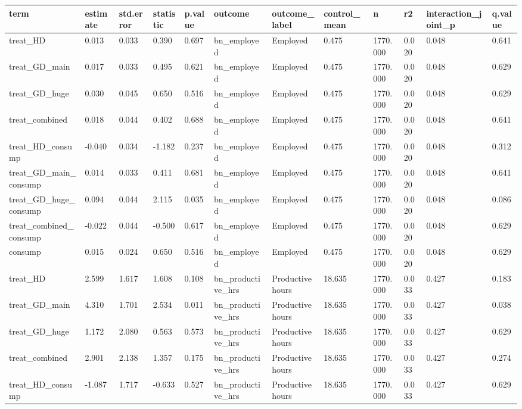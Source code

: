 \begin{tabular}{llllllllllll}
\toprule
term & estimate & std.error & statistic & p.value & outcome & outcome\_label & control\_mean & n & r2 & interaction\_joint\_p & q.value
 \\
\midrule
treat\_HD & 0.013 & 0.033 & 0.390 & 0.697 & bn\_employed & Employed & 0.475 & 1770.000 & 0.020 & 0.048 & 0.641 \\
treat\_GD\_main & 0.017 & 0.033 & 0.495 & 0.621 & bn\_employed & Employed & 0.475 & 1770.000 & 0.020 & 0.048 & 0.629 \\
treat\_GD\_huge & 0.030 & 0.045 & 0.650 & 0.516 & bn\_employed & Employed & 0.475 & 1770.000 & 0.020 & 0.048 & 0.629 \\
treat\_combined & 0.018 & 0.044 & 0.402 & 0.688 & bn\_employed & Employed & 0.475 & 1770.000 & 0.020 & 0.048 & 0.641 \\
treat\_HD\_consump & -0.040 & 0.034 & -1.182 & 0.237 & bn\_employed & Employed & 0.475 & 1770.000 & 0.020 & 0.048 & 0.312 \\
treat\_GD\_main\_consump & 0.014 & 0.033 & 0.411 & 0.681 & bn\_employed & Employed & 0.475 & 1770.000 & 0.020 & 0.048 & 0.641 \\
treat\_GD\_huge\_consump & 0.094 & 0.044 & 2.115 & 0.035 & bn\_employed & Employed & 0.475 & 1770.000 & 0.020 & 0.048 & 0.086 \\
treat\_combined\_consump & -0.022 & 0.044 & -0.500 & 0.617 & bn\_employed & Employed & 0.475 & 1770.000 & 0.020 & 0.048 & 0.629 \\
consump & 0.015 & 0.024 & 0.650 & 0.516 & bn\_employed & Employed & 0.475 & 1770.000 & 0.020 & 0.048 & 0.629 \\
treat\_HD & 2.599 & 1.617 & 1.608 & 0.108 & bn\_productive\_hrs & Productive hours & 18.635 & 1770.000 & 0.033 & 0.427 & 0.183 \\
treat\_GD\_main & 4.310 & 1.701 & 2.534 & 0.011 & bn\_productive\_hrs & Productive hours & 18.635 & 1770.000 & 0.033 & 0.427 & 0.038 \\
treat\_GD\_huge & 1.172 & 2.080 & 0.563 & 0.573 & bn\_productive\_hrs & Productive hours & 18.635 & 1770.000 & 0.033 & 0.427 & 0.629 \\
treat\_combined & 2.901 & 2.138 & 1.357 & 0.175 & bn\_productive\_hrs & Productive hours & 18.635 & 1770.000 & 0.033 & 0.427 & 0.274 \\
treat\_HD\_consump & -1.087 & 1.717 & -0.633 & 0.527 & bn\_productive\_hrs & Productive hours & 18.635 & 1770.000 & 0.033 & 0.427 & 0.629 \\

\end{tabular}
